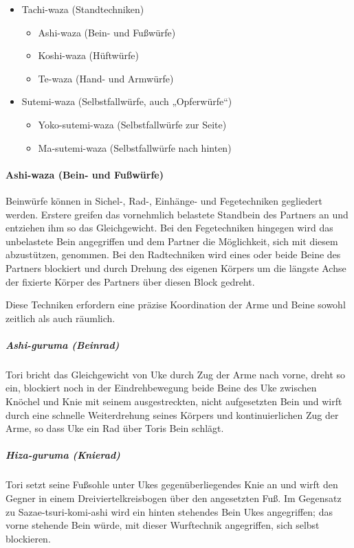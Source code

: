 \documentclass[justified, a4paper, notitlepage, captions=tableheading, nobib]{tufte-handout}
\begin{document}
\begin{itemize}
\item Tachi-waza (Standtechniken)
\begin{itemize}
\item Ashi-waza (Bein- und Fußwürfe)
\item Koshi-waza (Hüftwürfe)
\item Te-waza (Hand- und Armwürfe)
\end{itemize}
\item Sutemi-waza (Selbstfallwürfe, auch „Opferwürfe“)
\begin{itemize}
\item Yoko-sutemi-waza (Selbstfallwürfe zur Seite)
\item Ma-sutemi-waza (Selbstfallwürfe nach hinten)
\end{itemize}
\end{itemize}

\paragraph{Ashi-waza (Bein- und Fußwürfe)}
\label{sec:orgf676b1f}

Beinwürfe können in Sichel-, Rad-, Einhänge- und Fegetechniken gegliedert werden. Erstere greifen das vornehmlich belastete Standbein des Partners an und entziehen ihm so das Gleichgewicht. Bei den Fegetechniken hingegen wird das unbelastete Bein angegriffen und dem Partner die Möglichkeit, sich mit diesem abzustützen, genommen. Bei den Radtechniken wird eines oder beide Beine des Partners blockiert und durch Drehung des eigenen Körpers um die längste Achse der fixierte Körper des Partners über diesen Block gedreht.

Diese Techniken erfordern eine präzise Koordination der Arme und Beine sowohl zeitlich als auch räumlich.

\subparagraph{Ashi-guruma (Beinrad)}
\label{sec:org13bcfa2}
Tori bricht das Gleichgewicht von Uke durch Zug der Arme nach vorne, dreht so ein, blockiert noch in der Eindrehbewegung beide Beine des Uke zwischen Knöchel und Knie mit seinem ausgestreckten, nicht aufgesetzten Bein und wirft durch eine schnelle Weiterdrehung seines Körpers und kontinuierlichen Zug der Arme, so dass Uke ein Rad über Toris Bein schlägt.

\subparagraph{Hiza-guruma (Knierad)}
\label{sec:orgbc1d57e}
Tori setzt seine Fußsohle unter Ukes gegenüberliegendes Knie an und wirft den Gegner in einem Dreiviertelkreisbogen über den angesetzten Fuß.
Im Gegensatz zu Sazae-tsuri-komi-ashi wird ein hinten stehendes Bein Ukes angegriffen; das vorne stehende Bein würde, mit dieser Wurftechnik angegriffen, sich selbst blockieren.
\end{document}
